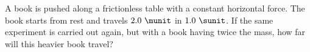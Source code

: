 A book is pushed along a frictionless table with a constant
horizontal force. The book starts from rest and travels $2.0\ \munit$
in $1.0\ \sunit$. If the same experiment is carried out again, but with
a book having twice the mass, how far will this heavier book
travel?\answercheck
